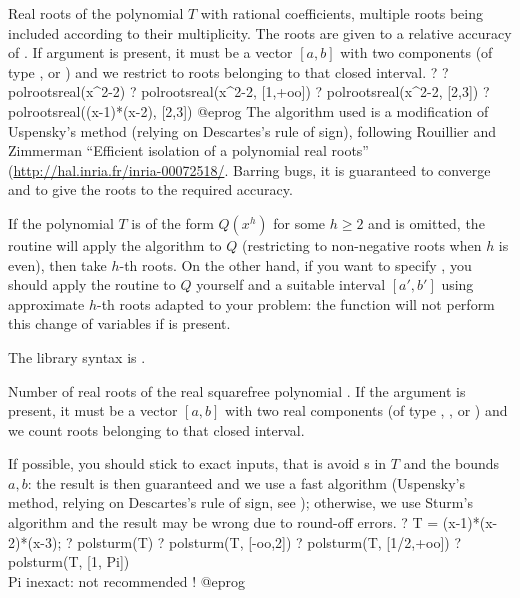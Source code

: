 \label{se:polrootsreal}
Real roots of the polynomial $T$ with rational coefficients, multiple
roots being included according to their multiplicity. The roots are given
to a relative accuracy of . If argument  is
present, it must be a vector $[a,b]$ with two components (of type
,  or ) and we restrict to roots belonging
to that closed interval.
\bprog
? 
? polrootsreal(x^2-2)
? polrootsreal(x^2-2, [1,+oo])
? polrootsreal(x^2-2, [2,3])
? polrootsreal((x-1)*(x-2), [2,3])
@eprog\noindent
The algorithm used is a modification of Uspensky's method (relying on
Descartes's rule of sign), following Rouillier and Zimmerman ``Efficient
isolation of a polynomial real roots''
(\url{http://hal.inria.fr/inria-00072518/}. Barring bugs, it is guaranteed
to converge and to give the roots to the required accuracy.

 If the polynomial $T$ is of the
form $Q(x^h)$ for some $h\geq 2$ and  is omitted, the routine will
apply the algorithm to $Q$ (restricting to non-negative roots when $h$ is
even), then take $h$-th roots. On the other hand, if you want to specify
, you should apply the routine to $Q$ yourself and a suitable
interval $[a',b']$ using approximate $h$-th roots adapted to your problem:
the function will not perform this change of variables if  is present.

The library syntax is .

\label{se:polsturm}
Number of real roots of the real squarefree polynomial . If
the argument  is present, it must be a vector $[a,b]$ with
two real components (of type , , 
or  ) and we count roots belonging to that closed interval.

If possible, you should stick to exact inputs, that is avoid s in
$T$ and the bounds $a,b$: the result is then guaranteed and we use a fast
algorithm (Uspensky's method, relying on Descartes's rule of sign, see
); otherwise, we use Sturm's algorithm and the result
may be wrong due to round-off errors.
\bprog
? T = (x-1)*(x-2)*(x-3);
? polsturm(T)
? polsturm(T, [-oo,2])
? polsturm(T, [1/2,+oo])
? polsturm(T, [1, Pi])  \\ Pi inexact: not recommended !
@eprog

